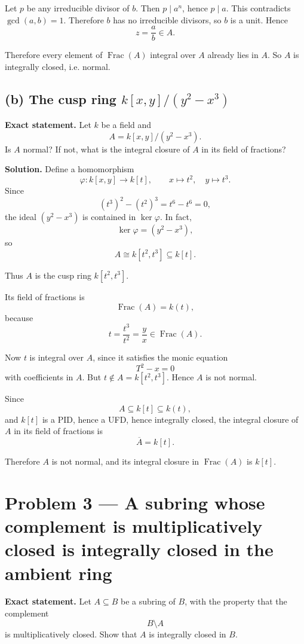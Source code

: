 \documentclass[12pt,a4paper,oneside]{report}
\theoremstyle{notespace}
\begin{document}
Let \(p\) be any irreducible divisor of \(b\). Then \(p\mid a^n\), hence \(p\mid a\). This contradicts \(\gcd(a,b)=1\). Therefore \(b\) has no irreducible divisors, so \(b\) is a unit. Hence
\[
z=\frac{a}{b}\in A.
\]

Therefore every element of \(\operatorname{Frac}(A)\) integral over \(A\) already lies in \(A\). So \(A\) is integrally closed, i.e. normal.

\subsection*{(b) The cusp ring \texorpdfstring{$k[x,y]/(y^2-x^3)$}{k[x,y]/(y\string^2-x\string^3)}}

\textbf{Exact statement.}
Let \(k\) be a field and
\[
A=k[x,y]/(y^2-x^3).
\]
Is \(A\) normal? If not, what is the integral closure of \(A\) in its field of fractions?

\textbf{Solution.}
Define a homomorphism
\[
\varphi:k[x,y]\to k[t],\qquad x\mapsto t^2,\quad y\mapsto t^3.
\]
Since
\[
(t^3)^2-(t^2)^3=t^6-t^6=0,
\]
the ideal \((y^2-x^3)\) is contained in \(\ker\varphi\). In fact,
\[
\ker\varphi=(y^2-x^3),
\]
so
\[
A\cong k[t^2,t^3]\subseteq k[t].
\]

Thus \(A\) is the cusp ring \(k[t^2,t^3]\).

Its field of fractions is
\[
\operatorname{Frac}(A)=k(t),
\]
because
\[
t=\frac{t^3}{t^2}=\frac{y}{x}\in \operatorname{Frac}(A).
\]

Now \(t\) is integral over \(A\), since it satisfies the monic equation
\[
T^2-x=0
\]
with coefficients in \(A\). But \(t\notin A=k[t^2,t^3]\). Hence \(A\) is not normal.

Since
\[
A\subseteq k[t]\subseteq k(t),
\]
and \(k[t]\) is a PID, hence a UFD, hence integrally closed, the integral closure of \(A\) in its field of fractions is
\[
\overline{A}=k[t].
\]

Therefore \(A\) is not normal, and its integral closure in \(\operatorname{Frac}(A)\) is \(k[t]\).	


\section{Problem 3 --- A subring whose complement is multiplicatively closed is integrally closed in the ambient ring}

\textbf{Exact statement.}
Let \(A\subseteq B\) be a subring of \(B\), with the property that the complement
\[
B\setminus A
\]
is multiplicatively closed. Show that \(A\) is integrally closed in \(B\).
\end{document}
